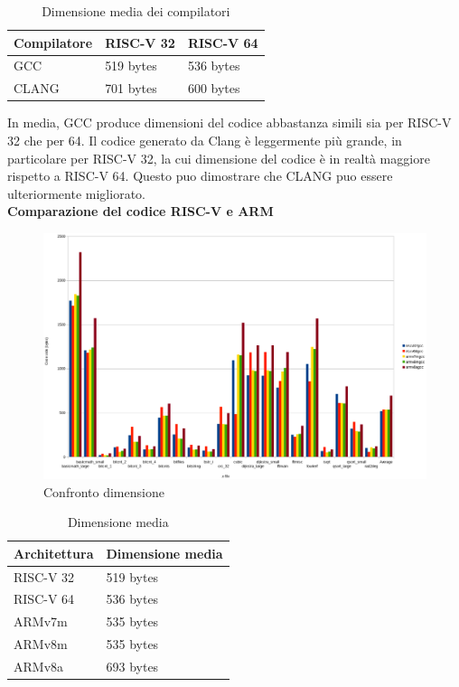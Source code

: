 \documentclass[12pt,a4paper]{report}
\begin{document}
\begin{table}[h!]
	\centering
	\begin{tabular}{| l | l | l |}
	\hline
		Compilatore & RISC-V 32 & RISC-V 64  \\ \hline
 	GCC	 & 519 bytes & 	536 bytes   \\ \hline
 	CLANG	 & 701 bytes &	600 bytes  \\ \hline
	\end{tabular}
	\caption{Dimensione media dei compilatori}
	\label{Tab:tabellaDimensioneMediaCompilatore}
\end{table}

In media, GCC produce dimensioni del codice abbastanza simili sia per RISC-V 32 che per 64. Il codice generato da Clang è leggermente più grande, in particolare per RISC-V 32, la cui dimensione del codice è in realtà maggiore rispetto a RISC-V 64. Questo puo dimostrare che CLANG puo essere ulteriormente migliorato. \\



\textbf{Comparazione del codice RISC-V e ARM}\\

\begin{figure}[h!]
	\centering
	\includegraphics[scale = 0.3]{CompilatoriGrafici/SizeComparision_ARM_RISCV.png}
	\caption{Confronto dimensione}
	\label{Fig:graficoSizeComparision}
\end{figure}

\begin{table}[h!]
	\centering
	\begin{tabular}{| l | l |}
	\hline
	Architettura & Dimensione media \\ \hline
	RISC-V 32	 & 519 bytes  \\ \hline
 	RISC-V 64	 & 536 bytes  \\ \hline
 	ARMv7m	 & 535 bytes  \\ \hline
 	ARMv8m	 & 535 bytes  \\ \hline
 	ARMv8a	 & 693 bytes  \\ \hline
	\end{tabular}
	\caption{Dimensione media}
	\label{Tab:tabellaDimensioneMediaArch}
\end{table}
\end{document}
